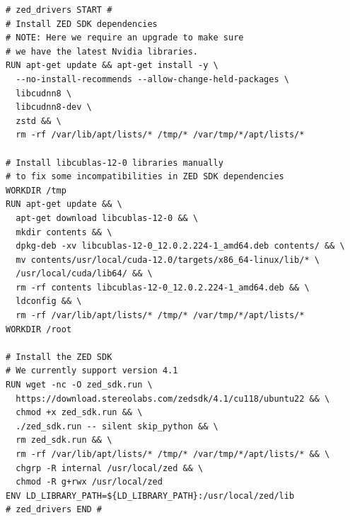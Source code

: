 \begin{center}
\begin{minipage}[t]{.9\textwidth}
\begin{lstlisting}[caption={Unit configuration of the \texttt{x86-cudev} target of the \texttt{zed\_drivers} DUA unit \cite{masocco_zed_drivers_nodate} as of November 26, 2024.}, label={lst:zeddriversx86cudev}]
# zed_drivers START #
# Install ZED SDK dependencies
# NOTE: Here we require an upgrade to make sure
# we have the latest Nvidia libraries.
RUN apt-get update && apt-get install -y \
  --no-install-recommends --allow-change-held-packages \
  libcudnn8 \
  libcudnn8-dev \
  zstd && \
  rm -rf /var/lib/apt/lists/* /tmp/* /var/tmp/*/apt/lists/*

# Install libcublas-12-0 libraries manually
# to fix some incompatibilities in ZED SDK dependencies
WORKDIR /tmp
RUN apt-get update && \
  apt-get download libcublas-12-0 && \
  mkdir contents && \
  dpkg-deb -xv libcublas-12-0_12.0.2.224-1_amd64.deb contents/ && \
  mv contents/usr/local/cuda-12.0/targets/x86_64-linux/lib/* \
  /usr/local/cuda/lib64/ && \
  rm -rf contents libcublas-12-0_12.0.2.224-1_amd64.deb && \
  ldconfig && \
  rm -rf /var/lib/apt/lists/* /tmp/* /var/tmp/*/apt/lists/*
WORKDIR /root

# Install the ZED SDK
# We currently support version 4.1
RUN wget -nc -O zed_sdk.run \
  https://download.stereolabs.com/zedsdk/4.1/cu118/ubuntu22 && \
  chmod +x zed_sdk.run && \
  ./zed_sdk.run -- silent skip_python && \
  rm zed_sdk.run && \
  rm -rf /var/lib/apt/lists/* /tmp/* /var/tmp/*/apt/lists/* && \
  chgrp -R internal /usr/local/zed && \
  chmod -R g+rwx /usr/local/zed
ENV LD_LIBRARY_PATH=${LD_LIBRARY_PATH}:/usr/local/zed/lib
# zed_drivers END #
\end{lstlisting}
\end{minipage}
\end{center}
